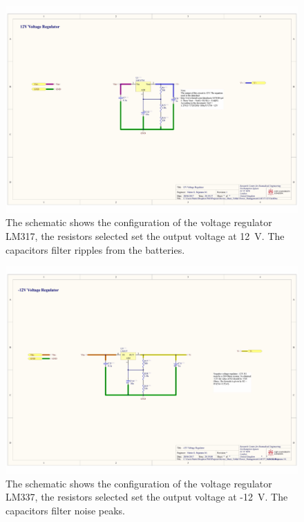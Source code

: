 \begin{landscape}
\begin{figure}[!htpb]
	\centering
	\includegraphics[width=0.95\paperwidth,keepaspectratio]{power_supply_12}
	\caption[Schematic of the \SI{12}{\volt} voltage regulator]{The schematic shows the configuration of the voltage regulator LM317, the resistors selected set the output voltage at \SI{12}{\volt}. The capacitors filter ripples from the batteries.}
	\label{fig:schematic PS 12}
\end{figure}
\end{landscape}

\begin{landscape}
\begin{figure}[!htpb]
	\centering
	\includegraphics[width=0.95\paperwidth,keepaspectratio]{power_supply_N12}
	\caption[Schematic of the -\SI{12}{\volt} voltage regulator]{The schematic shows the configuration of the voltage regulator LM337, the resistors selected set the output voltage at -\SI{12}{\volt}. The capacitors filter noise peaks.}
	\label{fig:schematic PS N12}
\end{figure}
\end{landscape}

